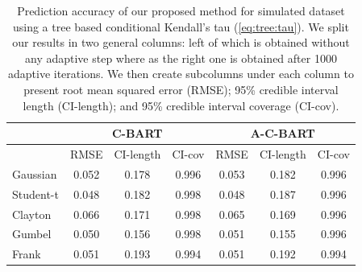 \documentclass{amsart}
\begin{document}
\begin{table}[ht]
	\centering
	\begin{tabular}{l|ccc|ccc}
		\multicolumn{1}{c|}{} &
		\multicolumn{3}{c|}{C-BART} &
		\multicolumn{3}{c}{A-C-BART} \\
		\midrule
		& RMSE & CI-length & CI-cov & RMSE & CI-length & CI-cov \\ 
		\midrule
		Gaussian & 0.052 & 0.178 & 0.996 & 0.053 & 0.182 & 0.996 \\ 
		Student-t & 0.048 & 0.182 & 0.998 & 0.048 & 0.187 & 0.996 \\ 
		Clayton & 0.066 & 0.171 & 0.998 & 0.065 & 0.169 & 0.996 \\ 
		Gumbel & 0.050 & 0.156 & 0.998 & 0.051 & 0.155 & 0.996 \\ 
		Frank & 0.051 & 0.193 & 0.994 & 0.051 & 0.192 & 0.994 \\ 
		\hline 
	\end{tabular}
	\caption{Prediction accuracy of our proposed method for simulated dataset using a tree based conditional Kendall's tau (\cref{eq:tree:tau}). We split our results in two general columns: left of which is obtained without any adaptive step where as the right one is obtained after 1000 adaptive iterations. We then create subcolumns under each column to present root mean squared error (RMSE); 95\% credible interval length (CI-length); and 95\% credible interval coverage (CI-cov).}
	\label{tab:pred:ex1}
\end{table}
\end{document}
